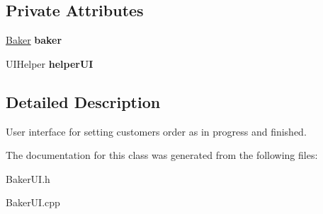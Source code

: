 \subsection*{Private Attributes}
\begin{CompactItemize}
\item 
\hypertarget{class_baker_u_i_623466d63908ff643b88d946e2f2fbd6}{
\hyperlink{class_baker}{Baker} {\bf baker}}
\label{class_baker_u_i_623466d63908ff643b88d946e2f2fbd6}

\item 
\hypertarget{class_baker_u_i_165ca02db075e280199e0970e3465900}{
UIHelper {\bf helper\-UI}}
\label{class_baker_u_i_165ca02db075e280199e0970e3465900}

\end{CompactItemize}


\subsection{Detailed Description}
User interface for setting customers order as in progress and finished. 



The documentation for this class was generated from the following files:\begin{CompactItemize}
\item 
Baker\-UI.h\item 
Baker\-UI.cpp\end{CompactItemize}
